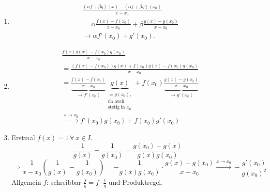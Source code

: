 \documentclass[../ana1.tex]{subfiles}
\begin{document}
\begin{bew}
    \begin{enumerate}
        \item 
        \begin{align*}
            &\frac{ (\alpha f + \beta g)(x) 
            - (\alpha f + \beta g)(x_0) }{ x - x_0 } \\
            &= \alpha \frac{ f(x) - f(x_0) }{x - x_0} + 
            \beta \frac{ g(x) - g(x_0) }{x - x_0}\\
            &\rightarrow \alpha f'(x_0) + g'(x_0).
        \end{align*}
        \item 
        \begin{align*}
            &\frac{ f(x) g(x) - f(x_0)g(x_0) }{ x - x_0 }\\ 
            &= \frac{ (f(x) - f(x_0))g(x) + f(x_0)g(x) 
            - f(x_0)g(x_0) }{ x - x_0 }\\
            &= \underbrace{\frac{f(x) - f(x_0)}{ x - x_0 }}_{
                \rightarrow f'(x_0)} \underbrace{g(x)}_{
                    \substack{=g(x_0),\\ \text{da auch}\\ \text{stetig in } x_0}} 
            + f(x_0) \underbrace{\frac{g(x) - g(x_0)}{ x - x_0 }}_{
                \rightarrow g'(x_0)} \\
            &\overset{x\rightarrow x_0}{\longrightarrow} f'(x_0) g(x_0) + f(x_0) g'(x_0)
        \end{align*}
        \item
        Erstmal \( f(x) = 1 \,\forall \, x \in I \).
        \[ \frac{1}{g(x)} - \frac{1}{g(x_0)} 
        = \frac{g(x_0) - g(x)}{g(x) g(x_0)} \]
        \[ \Rightarrow \frac{1}{x - x_0} 
        \left( \frac{1}{g(x)} - \frac{1}{g(x_0)} \right)
        = - \frac{1}{g(x) g(x_0)} \cdot \frac{g(x) - g(x_0)}{x - x_0} 
        \overset{x\rightarrow x_0}{\longrightarrow} 
        - \frac{g'(x_0)}{{g(x_0)}^2} \]
        Allgemein \(f\): schreibbar \( \frac{f}{g} = f \cdot \frac{1}{g} \) 
        und Produktregel.
    \end{enumerate}
\end{bew}
\end{document}
